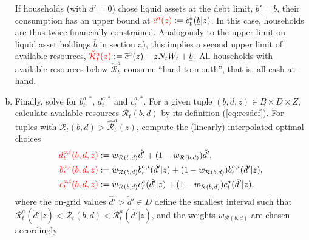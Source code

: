 \documentclass[11pt]{article} %
\begin{document}
\begin{enumerate}[a.)]
If households (with $d'=0$) chose liquid assets at the debt limit, $b'=\underline{b}$, their consumption has an upper bound at $\textcolor{red}{\overline{c}^a(z)} := \tilde{c}^a_t(\underline{b}|z)$. In this case, households are thus twice financially constrained. Analogously to the upper limit on liquid asset holdings $\overline{b}$ in section a), this implies a second upper limit of available resources, $\textcolor{red}{\check{\mathcal{R}}^a_t(z)} := \overline{c}^a(z) - zN_tW_t + \underline{b}$. All households with available resources below $\check{\mathcal{R}}^a_t$ consume ``hand-to-mouth'', that is, all cash-at-hand.

\item Finally, solve for $b^{a,*}_t$, $d^{a,*}_t$ and $c^{a,*}_t$. For a given tuple $(b,d,z)\in \overline{B}\times\overline{D}\times\overline{Z}$, calculate available resources $\mathcal{R}_t(b,d)$ by its definition (\ref{eq:resdef}). For tuples with $\mathcal{R}_t(b,d)>\hat{\mathcal{R}}^a_t(z)$, compute the (linearly) interpolated optimal choices
\begin{align}
\textcolor{red}{d_t^{a,i}(b,d,z)} &:= w_{\mathcal{R}(b,d)}\hat{d}' + (1-w_{\mathcal{R}(b,d)})\check{d}',\\
\textcolor{red}{b_t^{a,i}(b,d,z)} &:= w_{\mathcal{R}(b,d)}b_t^{a,i}(\hat{d}'|z) + (1-w_{\mathcal{R}(b,d)})b_t^{a,i}(\check{d}'|z),\\
\textcolor{red}{c_t^{a,i}(b,d,z)} &:= w_{\mathcal{R}(b,d)}c_t^a(\hat{d}'|z) + (1-w_{\mathcal{R}(b,d)})c_t^a(\check{d}'|z),
\end{align}
where the on-grid values $\hat{d}'>\check{d}'\in\overline{D}$ define the smallest interval such that $\mathcal{R}^a_t(\check{d}'|z) < \mathcal{R}_t(b,d) < \mathcal{R}^a_t(\hat{d}'|z)$, and the weights $w_{\mathcal{R}(b,d)}$ are chosen accordingly.


\end{enumerate}
\end{document}
